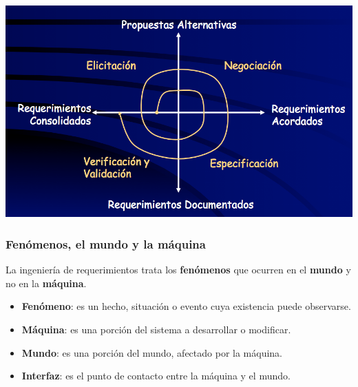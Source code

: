 \documentclass[]{article}
\begin{document}
\begin{center}
	\includegraphics[scale=0.50]{IR_ciclo.png}
\end{center}

\subsubsection{Fenómenos, el mundo y la máquina}
La ingeniería de requerimientos trata los \textbf{fenómenos} que ocurren en el \textbf{mundo} y no en la \textbf{máquina}.
\begin{itemize}
	\item \textbf{Fenómeno}: es un hecho, situación o evento cuya existencia puede observarse.
	\item \textbf{Máquina}: es una porción del sistema a desarrollar o modificar.
	\item \textbf{Mundo}: es una porción del mundo, afectado por la máquina.
	\item \textbf{Interfaz}: es el punto de contacto entre la máquina y el mundo.
\end{itemize}
\end{document}
